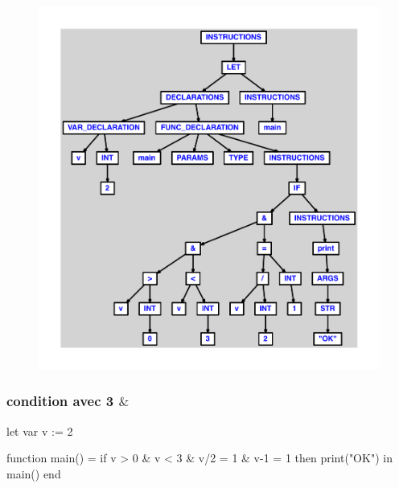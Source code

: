 \documentclass{article}
\begin{document}
\begin{figure}[H]\centering\includegraphics[max width=\textwidth]{ast/ast_2.pdf}\end{figure}\subsubsection{condition avec 3 $ \& $}
\begin{verbatimtab}
let
	var v := 2

	function main() =
		if v > 0 & v < 3 & v/2 = 1 & v-1 = 1 then print("OK")
in main() end
\end{verbatimtab}
\end{document}
